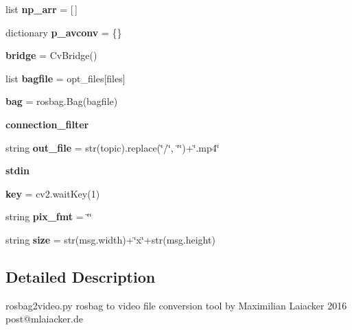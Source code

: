 \begin{DoxyCompactItemize}
list {\bfseries np\+\_\+arr} = \mbox{[}$\,$\mbox{]}
\item 
\mbox{\label{namespacebag__to__video_af7c982e8b4b670b7eb874895a9ee834e}} 
dictionary {\bfseries p\+\_\+avconv} = \{\}
\item 
\mbox{\label{namespacebag__to__video_aaaa3b65de0a4966740e9d4c2864786a5}} 
{\bfseries bridge} = Cv\+Bridge()
\item 
\mbox{\label{namespacebag__to__video_a115d9287326df23fbaa1d5c4becb4816}} 
list {\bfseries bagfile} = opt\+\_\+files\mbox{[}files\mbox{]}
\item 
\mbox{\label{namespacebag__to__video_aaca30213537774dc75d31e56fda12b3b}} 
{\bfseries bag} = rosbag.\+Bag(bagfile)
\item 
\mbox{\label{namespacebag__to__video_a45a9d8e744d4fe563f6e84be993aff2a}} 
{\bfseries connection\+\_\+filter}
\item 
\mbox{\label{namespacebag__to__video_ae4a4ef18ecbd9301cfb6db22037da58f}} 
string {\bfseries out\+\_\+file} = str(topic).replace(\char`\"{}/\char`\"{}, \char`\"{}\char`\"{})+\char`\"{}.mp4\char`\"{}
\item 
\mbox{\label{namespacebag__to__video_ab4bc8ce1bfa04207257f94d275d306a5}} 
{\bfseries stdin}
\item 
\mbox{\label{namespacebag__to__video_a2e9d7171c2576f6d3baf4d4b6fec7d24}} 
{\bfseries key} = cv2.\+wait\+Key(1)
\item 
\mbox{\label{namespacebag__to__video_aa5763ed546b242118a22ddc431a6f1c1}} 
string {\bfseries pix\+\_\+fmt} = \char`\"{}\char`\"{}
\item 
\mbox{\label{namespacebag__to__video_abba256d37543afe245324570c660f155}} 
string {\bfseries size} = str(msg.\+width)+\char`\"{}x\char`\"{}+str(msg.\+height)
\end{DoxyCompactItemize}


\subsection{Detailed Description}
\begin{DoxyVerb}rosbag2video.py
rosbag to video file conversion tool
by Maximilian Laiacker 2016
post@mlaiacker.de
\end{DoxyVerb}
 